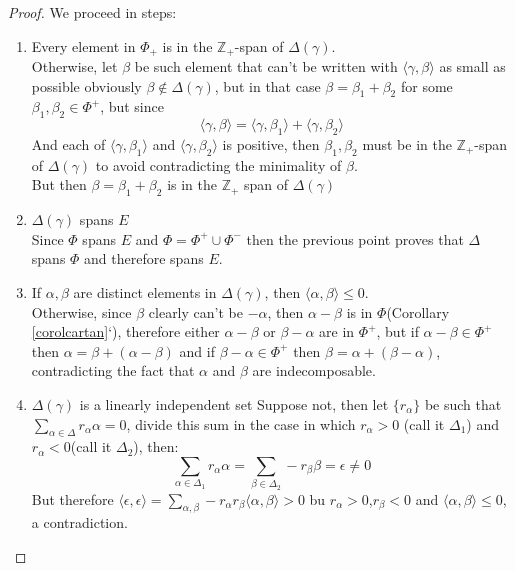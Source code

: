 \begin{proof}
We proceed in steps:
\begin{enumerate}
	\item Every element in $\Phi_+$ is in the $\mathbb{Z}_+$-span of $\Delta(\gamma)$.\\
	Otherwise, let $\beta$ be such element that can't be written with $\langle \gamma,\beta \rangle$ as small as possible obviously $\beta \not \in \Delta(\gamma)$, but in that case $\beta=\beta_1+\beta_2$ for some $\beta_1,\beta_2 \in \Phi^+$, but since $$\langle \gamma,\beta \rangle = \langle \gamma,\beta_1 \rangle + \langle \gamma,\beta_2 \rangle$$
	And each of $\langle \gamma,\beta_1 \rangle$ and $\langle \gamma,\beta_2\rangle$ is positive, then $\beta_1,\beta_2$ must be in the $\mathbb{Z}_+$-span of $\Delta(\gamma)$ to avoid contradicting the minimality of $\beta$.\\
	But then $\beta = \beta_1+\beta_2$ is in the $\mathbb{Z}_+$ span of $\Delta(\gamma)$
	\item $\Delta(\gamma)$ spans $E$\\
	Since $\Phi$ spans $E$ and $\Phi=\Phi^+\cup\Phi^-$ then the previous point proves that $\Delta$ spans $\Phi$ and therefore spans $E$.
	\item If $\alpha,\beta$ are distinct elements in $\Delta(\gamma)$, then $\langle \alpha, \beta \rangle \le 0$.\\ Otherwise, since $\beta$ clearly can't be $-\alpha$, then $\alpha-\beta$ is in $\Phi$(Corollary \ref{corolcartan}`), therefore either $\alpha-\beta$ or $\beta-\alpha$ are in $\Phi^+$, but if $\alpha-\beta \in \Phi^+$ then $\alpha = \beta + (\alpha-\beta)$ and if $\beta-\alpha \in \Phi^+$ then $\beta = \alpha + (\beta-\alpha)$, contradicting the fact that $\alpha$ and $\beta$ are indecomposable.
	\item $\Delta(\gamma)$ is a linearly independent set
	Suppose not, then let $\{r_\alpha\}$ be such that $\sum_{\alpha \in \Delta} r_\alpha \alpha = 0$, divide this sum in the case in which $r_\alpha > 0$ (call it $\Delta_1$) and $r_\alpha<0$(call it $\Delta_2$), then:
	$$\sum_{\alpha \in \Delta_1}r_\alpha \alpha = \sum_{\beta \in \Delta_2}-r_\beta \beta = \epsilon \not=0$$
	But therefore $\langle \epsilon,\epsilon\rangle=\displaystyle\sum_{\alpha,\beta} -r_\alpha r_\beta\langle \alpha,\beta\rangle > 0$ bu $r_\alpha>0$,$r_\beta <0$ and $\langle \alpha, \beta \rangle \le 0$, a contradiction.\\

\end{enumerate}
\end{proof}
